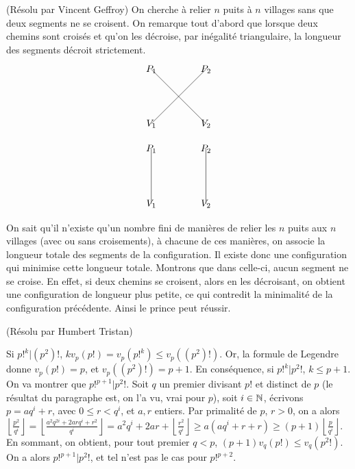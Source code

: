 \begin{sol}[62](Résolu par Vincent Geffroy)
On cherche \`a relier $n$ puits \`a $n$ villages sans que deux segments ne se croisent.
On remarque tout d'abord que lorsque deux chemins sont crois\'es et qu'on les d\'ecroise, par in\'egalit\'e triangulaire, la longueur des segments d\'ecroit strictement.
\[\begin{tikzpicture}[scale=1]
\draw (0, 0)--(2,2 );
\draw (2, 0)--(0,2 );
\node at (0,0) {$V_1$};
\node at (2,0) {$V_2$};
\node at (0,2) {$P_1$};
\node at (2,2) {$P_2$};

\end{tikzpicture}\]

\[\begin{tikzpicture}[scale=1]
\draw (0, 0)--(0,2 );
\draw (2, 0)--(2,2 );
\node at (0,0) {$V_1$};
\node at (2,0) {$V_2$};
\node at (0,2) {$P_1$};
\node at (2,2) {$P_2$};

\end{tikzpicture}\]

On sait qu'il n'existe qu'un nombre fini de mani\`eres de relier les $n$ puits aux $n$ villages (avec ou sans croisements), \`a chacune de ces mani\`eres, on associe la longueur totale des segments de la configuration. Il existe donc une configuration qui minimise cette longueur totale.
Montrons que dans celle-ci, aucun segment ne se croise.
En effet, si deux chemins se croisent, alors en les d\'ecroisant, on obtient une configuration de longueur plus petite, ce qui contredit la minimalit\'e de la configuration pr\'ec\'edente.
Ainsi le prince peut r\'eussir.

\end{sol}

\begin{sol}[64](R\'esolu par Humbert Tristan)

		Si $p!^k | (p^2)!$, $kv_p(p!) = v_p(p!^k) \leq v_p((p^2)!)$. 
		Or, la formule de Legendre donne $v_p(p!)=p$, et $v_p((p^2)!)=p+1$. En cons\'equence, si $p!^k | p^2!$, $k \leq p+1$. \\
		On va montrer que $p!^{p+1} | p^2!$. Soit $q$ un premier divisant $p!$ et distinct de $p$ (le r\'esultat du paragraphe est, on l'a vu, vrai pour $p$), soit $i \in \mathbb{N}$, \'ecrivons $p=aq^i+r$, avec $0 \leq r < q^i$, et $a,r$ entiers. Par primalit\'e de $p$, $r > 0$, on a alors \\ $\left\lfloor \frac{p^2}{q^i}\right\rfloor = \left\lfloor \frac{a^2q^{2i}+2arq^i+r^2}{q^i}\right\rfloor=a^2q^i+2ar+\left\lfloor \frac{r^2}{q^i}\right\rfloor \geq a(aq^i+r+r) \geq (p+1) \left\lfloor \frac{p}{q^i}\right\rfloor$. En sommant, on obtient, pour tout premier $q < p$, $(p+1)v_q(p!) \leq v_q(p^2!)$. \\
		On a alors $p!^{p+1} | p^2!$, et tel n'est pas le cas pour $p!^{p+2}$. 
\end{sol}



